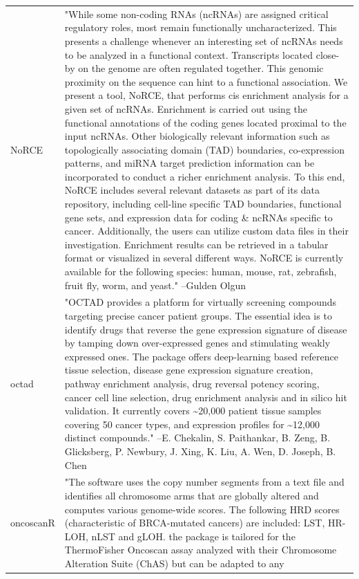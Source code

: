 \begin{longtable}[t]{l>{\raggedright\arraybackslash}p{25em}}
NoRCE & "While some non-coding RNAs (ncRNAs) are assigned critical
regulatory roles, most remain functionally uncharacterized.
This presents a challenge whenever an interesting set of ncRNAs
needs to be analyzed in a functional context. Transcripts
located close-by on the genome are often regulated together.
This genomic proximity on the sequence can hint to a functional
association. We present a tool, NoRCE, that performs cis
enrichment analysis for a given set of ncRNAs. Enrichment is
carried out using the functional annotations of the coding
genes located proximal to the input ncRNAs. Other biologically
relevant information such as topologically associating domain
(TAD) boundaries, co-expression patterns, and miRNA target
prediction information can be incorporated to conduct a richer
enrichment analysis. To this end, NoRCE includes several
relevant datasets as part of its data repository, including
cell-line specific TAD boundaries, functional gene sets, and
expression data for coding \& ncRNAs specific to cancer.
Additionally, the users can utilize custom data files in their
investigation. Enrichment results can be retrieved in a tabular
format or visualized in several different ways. NoRCE is
currently available for the following species: human, mouse,
rat, zebrafish, fruit fly, worm, and yeast." --Gulden Olgun\\
octad & "OCTAD provides a platform for virtually screening
compounds targeting precise cancer patient groups. The
essential idea is to identify drugs that reverse the gene
expression signature of disease by tamping down over-expressed
genes and stimulating weakly expressed ones. The package offers
deep-learning based reference tissue selection, disease gene
expression signature creation, pathway enrichment analysis,
drug reversal potency scoring, cancer cell line selection, drug
enrichment analysis and in silico hit validation. It currently
covers \textasciitilde{}20,000 patient tissue samples covering 50 cancer types,
and expression profiles for \textasciitilde{}12,000 distinct compounds." --E. Chekalin, S. Paithankar, B. Zeng, B. Glicksberg, P. Newbury, J. Xing, K. Liu, A. Wen, D. Joseph, B. Chen\\
oncoscanR & "The software uses the copy number segments from a text
file and identifies all chromosome arms that are globally
altered and computes various genome-wide scores. The following
HRD scores (characteristic of BRCA-mutated cancers) are
included: LST, HR-LOH, nLST and gLOH. the package is tailored
for the ThermoFisher Oncoscan assay analyzed with their
Chromosome Alteration Suite (ChAS) but can be adapted to any

\end{longtable}

